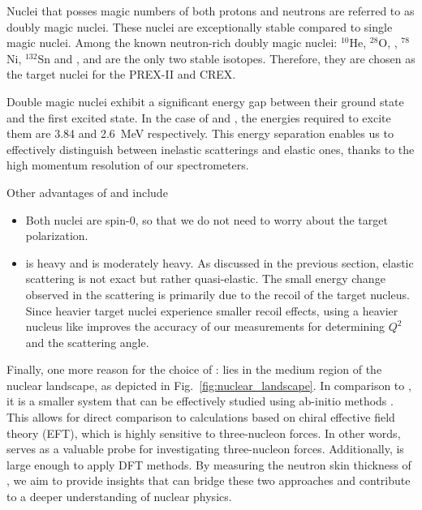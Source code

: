 Nuclei that posses magic numbers of both protons and neutrons are referred to 
as doubly magic nuclei. These nuclei are exceptionally stable compared to single
magic nuclei. Among the known neutron-rich doubly magic nuclei: 
${}^{10}$He, ${}^{28}$O, \Ca, ${}^{78}$Ni, ${}^{132}$Sn and \Pb, 
\Ca and \Pb are the only two stable isotopes. Therefore, they
are chosen as the target nuclei for the PREX-II and CREX.

Double magic nuclei exhibit a significant energy gap between their ground state
and the first excited state. In the case of \Ca and \Pb, the energies required
to excite them are 3.84 and 2.6~MeV respectively. 
This energy separation enables us to effectively distinguish between inelastic 
scatterings and elastic ones, thanks to the high momentum resolution of our spectrometers.

Other advantages of \Ca and \Pb include
\begin{itemize}
    \item Both nuclei are spin-0, so that we do not need to worry about the target polarization.
    \item \Pb is heavy and \Ca is moderately heavy. As discussed in the previous section, 
	elastic scattering is not exact but rather quasi-elastic. The small energy change 
	observed in the scattering is primarily due to the recoil of the target nucleus. 
	Since heavier target nuclei experience smaller recoil effects, using a heavier nucleus like \Pb improves the accuracy of our measurements for determining $Q^2$ and the scattering angle.
\end{itemize}

Finally, one more reason for the choice of \Ca: \Ca lies in the medium region of the nuclear 
landscape, as depicted in Fig.~\ref{fig:nuclear_landscape}. In comparison to \Pb, 
it is a smaller system that can be effectively studied using ab-initio methods \cite{Hagen2016}.
This allows for direct comparison to calculations based on chiral effective field theory (EFT), which is highly sensitive to three-nucleon forces. In other words, \Ca serves as a valuable probe for investigating three-nucleon forces. Additionally, \Ca is large enough to apply DFT methods. By measuring the neutron skin thickness of \Ca, we aim to provide insights that can bridge these two approaches and contribute to a deeper understanding of nuclear physics.
